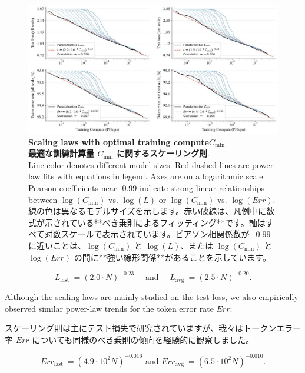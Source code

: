 \documentclass{article}
\begin{document}
\begin{figure}[h]
\begin{center}
  \includegraphics[width=\textwidth]{2025_10_26_62f95e615e8879e267a8g-09}
\caption{
\textbf{Scaling laws with optimal training compute$C_\mathrm{min}$
\\
最適な訓練計算量 $C_{\text{min}}$ に関するスケーリング則}.
\\
Line color denotes different model sizes. Red dashed lines are power-law fits with equations in legend. Axes are on a logarithmic scale. Pearson coefficients near -0.99 indicate strong linear relationships between $\log\left(C_\mathrm {min}\right)$ vs. $\log(L)$ or $\log \left(C_\mathrm{min}\right)$ vs. $\log(Err)$.
\\
線の色は異なるモデルサイズを示します。赤い破線は、凡例中に数式が示されている**べき乗則によるフィッティング**です。軸はすべて対数スケールで表示されています。ピアソン相関係数が$-0.99$に近いことは、$\log(C_{\text{min}})$ と $\log(L)$、または $\log(C_{\text{min}})$ と $\log(Err)$ の間に**強い線形関係**があることを示しています。
}

\end{center}
\end{figure}


$$
L_{\text {last }}=(2.0 \cdot N)^{-0.23} \quad \text { and } \quad L_{\text {avg }}=(2.5 \cdot N)^{-0.20} .
$$

Although the scaling laws are mainly studied on the test loss, we also empirically observed similar power-law trends for the token error rate $Err$:

スケーリング則は主にテスト損失で研究されていますが、我々はトークンエラー率 $Err$ についても同様のべき乗則の傾向を経験的に観察しました。

$$
E r r_{\text {last }}=\left(4.9 \cdot 10^{2} N\right)^{-0.016} \text { and } E r r_{\text {avg }}=\left(6.5 \cdot 10^{2} N\right)^{-0.010} .
$$
\end{document}

